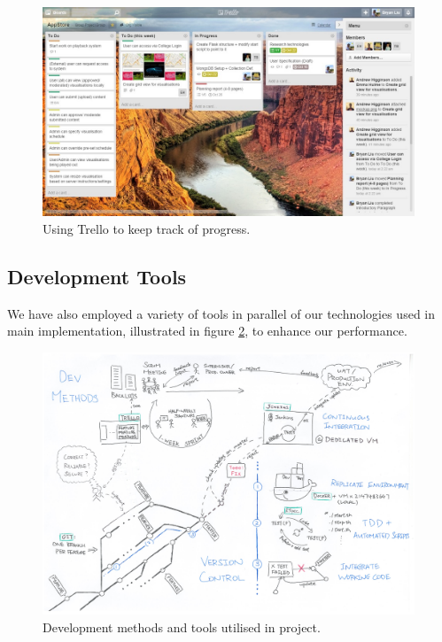 ﻿\documentclass[a4paper, titlepage]{article}
\begin{document}
\begin{figure}[ht]
  \centering
    \includegraphics[width = 0.99\textwidth]{./projman/trello.jpg}
  \caption{Using Trello to keep track of progress.}
  \label{fig:trello}
\end{figure}

\subsection{Development Tools}
We have also employed a variety of tools in parallel of our technologies used
in main implementation, illustrated in figure \ref{fig:projman_devtools}, to
enhance our performance.

\begin{figure}[ht]
  \centering
    \includegraphics[width = 0.99\textwidth]{./projman/devtools.pdf}
  \caption{Development methods and tools utilised in project.}
  \label{fig:projman_devtools}
\end{figure}
\end{document}
